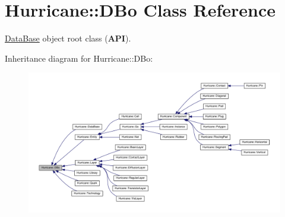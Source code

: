 \hypertarget{classHurricane_1_1DBo}{}\section{Hurricane\+:\+:D\+Bo Class Reference}
\label{classHurricane_1_1DBo}


\mbox{\hyperlink{classHurricane_1_1DataBase}{Data\+Base}} object root class ({\bfseries A\+PI}).  




Inheritance diagram for Hurricane\+:\+:D\+Bo\+:\nopagebreak
\begin{figure}[H]
\begin{center}
\leavevmode
\includegraphics[width=350pt]{classHurricane_1_1DBo__inherit__graph}
\end{center}
\end{figure}
